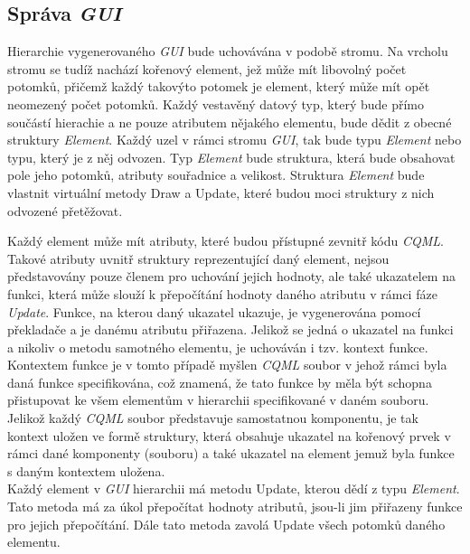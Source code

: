 \documentclass[11pt,twoside,a4paper]{book}
\begin{document}
\subsection {Správa \textit{GUI}}
Hierarchie vygenerovaného \textit{GUI} bude uchovávána v podobě stromu. Na vrcholu stromu se tudíž nachází kořenový element, jež může mít libovolný počet potomků, přičemž každý takovýto potomek je element, který může mít opět neomezený počet potomků. Každý vestavěný datový typ, který bude přímo součástí hierachie a ne pouze atributem nějakého elementu, bude dědit z obecné struktury \textit{Element}. Každý uzel v rámci stromu \textit{GUI}, tak bude typu \textit{Element} nebo typu, který je z něj odvozen. Typ \textit{Element} bude struktura, která bude obsahovat pole jeho potomků, atributy souřadnice a velikost. Struktura \textit{Element} bude vlastnit virtuální metody Draw a Update, které budou moci struktury z nich odvozené přetěžovat.

Každý element může mít atributy, které budou přístupné zevnitř kódu \textit{CQML}. Takové atributy uvnitř struktury reprezentující daný element, nejsou představovány pouze členem pro uchování jejich hodnoty, ale také ukazatelem na funkci, která může slouží k přepočítání hodnoty daného atributu v rámci fáze \textit{Update}. Funkce, na kterou daný ukazatel ukazuje, je vygenerována pomocí překladače a je danému atributu přiřazena. Jelikož se jedná o ukazatel na funkci a nikoliv o metodu samotného elementu, je uchováván i tzv. kontext funkce. Kontextem funkce je v tomto případě myšlen \textit{CQML} soubor v jehož rámci byla daná funkce specifikována, což znamená, že tato funkce by měla být schopna přistupovat ke všem elementům v hierarchii specifikované v daném souboru. Jelikož každý \textit{CQML} soubor představuje samostatnou komponentu, je tak kontext uložen ve formě struktury, která obsahuje ukazatel na kořenový prvek v rámci dané komponenty (souboru) a také ukazatel na element jemuž byla funkce s daným kontextem uložena.\\
Každý element v \textit{GUI} hierarchii má metodu Update, kterou dědí z typu \textit{Element}. Tato metoda má za úkol přepočítat hodnoty atributů, jsou-li jim přiřazeny funkce pro jejich přepočítání. Dále tato metoda zavolá Update všech potomků daného elementu.
\end{document}
